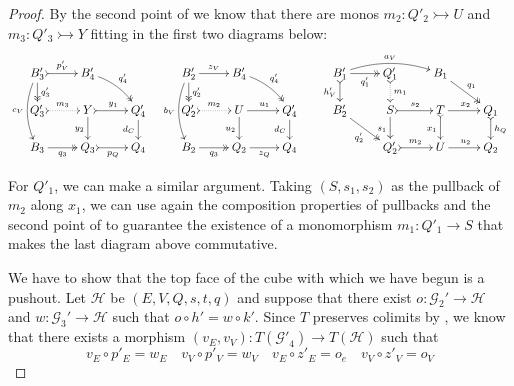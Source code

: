 \documentclass[3p]{elsarticle}
\newcommand{\commentato}[1]{ {} }
\newcommand{\mto}{\rightarrowtail}
\theoremstyle{remark}
\theoremstyle{definition}
\begin{document}
\begin{proof}
	By the second point of  we know that there are monos $m_2\colon Q'_2\mto U$ and $m_3\colon Q'_3\mto Y$  fitting in the first two diagrams below:
	\[\xymatrix@R=15pt{B'_3 \ar@{>>}[d]^{q'_3} \ar@/_.3cm/[dd]_{c_V} \ar@{>->}[r]^{p'_V}& B'_4 \ar@/^.2cm/@{>>}[dr]^{q'_4} & & B'_2 \ar[r]^{z_V} \ar@{>>}[d]^{q'_2} \ar@/_.3cm/[dd]_{b_V}& B'_4 \ar@/^.2cm/@{>>}[dr]^{q'_4} &&B'_1\ar@{>>}[r]_{q'_1} \ar@{>->}[d]_{h'_V} \ar@/^.3cm/[rr]^{a_V} & Q'_1 \ar@{>.>}[d]^{m_1} & B_1 \ar@{>>}[dr]^{q_1}\\ Q'_3 \ar@{>.>}[r]^{m_3}& Y  \ar@{>->}[r]^{y_1} \ar[d]_{y_2}& Q'_4 \ar[d]_{d_C}& Q'_2 \ar@{>.>}[r]^{m_2} & U \ar[d]_{u_2} \ar[r]^{u_1} & Q'_4 \ar[d]_{d_C} &B'_2 \ar@{>>}[dr]_{q'_2} & S \ar@{>->}[r]^{s_2} \ar[d]_{s_1} & T \ar[r]^{x_2} \ar@{>->}[d]_{x_1}  & Q_1 \ar@{>->}[d]^{h_Q}\\ B_3 \ar@{>>}[r]_{q_3} & Q_3 \ar@{>->}[r]_{p_Q} & Q_4 &B_2 \ar@{>>}[r]_{q_3} & Q_2 \ar[r]_{z_Q} & Q_4&& Q'_2 \ar@{>->}[r]^{m_2}& U \ar[r]^{u_2}& Q_2 }\]
	
	
	For $Q'_1$, we can make a similar argument. Taking $(S, s_1, s_2)$ as the pullback of $m_2$ along $x_1$, we can use again the composition properties of pullbacks and the second point of  to guarantee the existence of a monomorphism $m_1\colon Q'_1\to S$ that makes the last diagram above commutative.
		
We have to show that the top face of the cube with which we have begun is a pushout. Let $\mathcal{H}$ be $(E, V, Q, s, t, q)$ and suppose that there exist  $o\colon  \mathcal{G}_2' \to \mathcal{H}$ and $w\colon  \mathcal{G}_3' \to \mathcal{H}$ such that $o \circ h' = w \circ k'$. Since $T$ preserves colimits by , we know that there exists a morphism $(v_E, v_V)\colon T(\mathcal{G'}_4)\to T(\mathcal{H})$ such that
\[v_E\circ p'_E=w_E \quad v_V\circ p'_V=w_V \quad v_E\circ z'_E=o_e \quad v_V\circ z'_V=o_V\]

\commentato{\xymatrix@C=10pt@R=6pt{
		&B_1'\ar@{>>}[dd]|\hole_(.65){q_1'}\ar@{>->}[rr]^{h_V'} \ar[dl]_(.6){k_V'} && B_2' \ar@{>>}[dd]|\hole_(.65){q_2'} \ar[dl]_(.6){z_V'}\ar[dr]^{o_V}\\
		B_3'  \ar@{>>}[dd]_{q_3'}\ar@{>->}[rr]^(.7){p_V'} & & B_4' \ar@{>>}[dd]_(.3){q_4'} \ar[rr]^(.7){v_V}&&  V\ar[dd]^{q}\\
		&Q_1'\ar@{>->}[rr]|\hole^(.65){h'_Q} \ar[dl]_{k'_Q} && Q_2' \ar[dl]^(.4){z_Q'}\ar[dr]^{o_Q}\\
		Q'_3 \ar@{>->}[rr]_{p_Q'} & & Q'_4\ar@{.>}[rr]_{v_C} && Q
}}


\end{proof}
\end{document}
